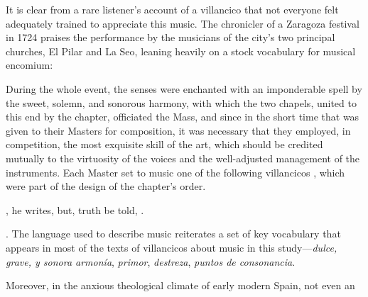 It is clear from a rare listener's account of a villancico that not everyone
felt adequately trained to appreciate this music.
The chronicler of a Zaragoza festival in 1724 praises the performance by the
musicians of the city's two principal churches, El Pilar and La Seo, leaning
heavily on a stock vocabulary for musical encomium: 
\begin{quoting}
    During the whole event, the senses were enchanted with an imponderable spell
    by the sweet, solemn, and sonorous harmony, with which the two chapels,
    united to this end by the chapter, officiated the Mass, and since in the
    short time that was given to their Masters for composition, it was necessary
    that they employed, in competition, the most exquisite skill
     of the art, which should be credited mutually to the
    virtuosity  of the voices and the well-adjusted management
    of the instruments.  Each Master set to music one of the following
    villancicos , which were part of the design
    of the chapter's order.
\end{quoting}
, he
writes, but, truth be told, .%
\begin{Footnote}
    \Autocite
    [97: ]
    {Zaragoza1724Relacion}.
    The language used to describe music reiterates a set of key vocabulary that
    appears in most of the texts of villancicos about music in this
    study---\emph{dulce, grave, y sonora armonía}, \emph{primor},
    \emph{destreza}, \emph{puntos de consonancia}.
\end{Footnote}
Moreover, in the anxious theological climate of early modern Spain, not even an
